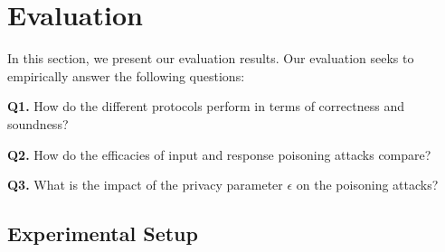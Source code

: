 \vspace{-0.1cm}\section{Evaluation}\label{sec:eval}

In this section, we present our evaluation results. Our evaluation seeks to empirically answer the following questions:
\squishlist
    \item \textbf{Q1.} How do the different protocols perform in terms of correctness and soundness?
    \item \textbf{Q2.} How do the efficacies of input and response poisoning attacks compare?
    \item \textbf{Q3.} What is the impact of the privacy parameter $\epsilon$ on the poisoning attacks?
\squishend
  \vspace{-0.4cm}  \subsection{Experimental Setup}\label{sec:exp-setup}

